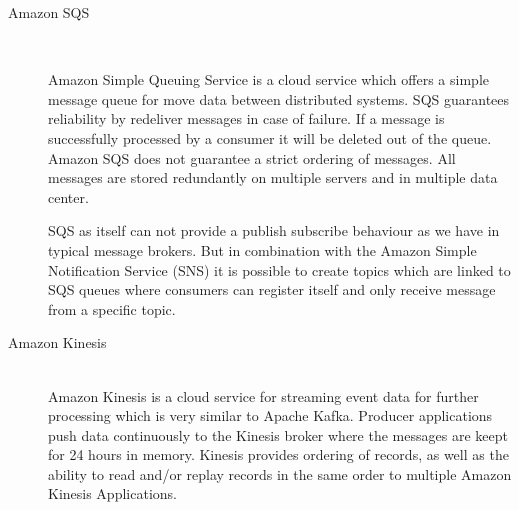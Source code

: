\begin{description}
    \item [Amazon SQS] \hfill \\
    {
    Amazon Simple Queuing Service is a cloud service which offers a simple
    message queue for move data between distributed systems. SQS guarantees
    reliability by redeliver messages in case of failure. If a message is
    successfully processed by a consumer it will be deleted out of the queue.
    Amazon SQS does not guarantee a strict ordering of messages. All messages
    are stored redundantly on multiple servers and in multiple data center.
    \cite{amazonSQS} \cite{amazonSQSFaq} 

    SQS as itself can not provide a publish subscribe behaviour as we
    have in typical message brokers. But in combination with the Amazon
    Simple  Notification Service (SNS) it
    is possible to create topics which are linked to SQS queues where
    consumers can register itself and only receive message from a specific
    topic. \cite{amazonSqsPubSub}
     }
    \item [Amazon Kinesis] \hfill \\
    { 
    Amazon Kinesis is a cloud service for streaming event
    data for further processing which is very similar to Apache Kafka. Producer
    applications push data continuously to the Kinesis broker where the messages
    are keept for 24 hours in memory. Kinesis provides ordering of records, as
    well as the ability to read and/or replay records in the same order to
    multiple Amazon Kinesis Applications.
    \cite{amazonKinesis} \cite{amazonKinesisFAQ} 
    }


\end{description}
